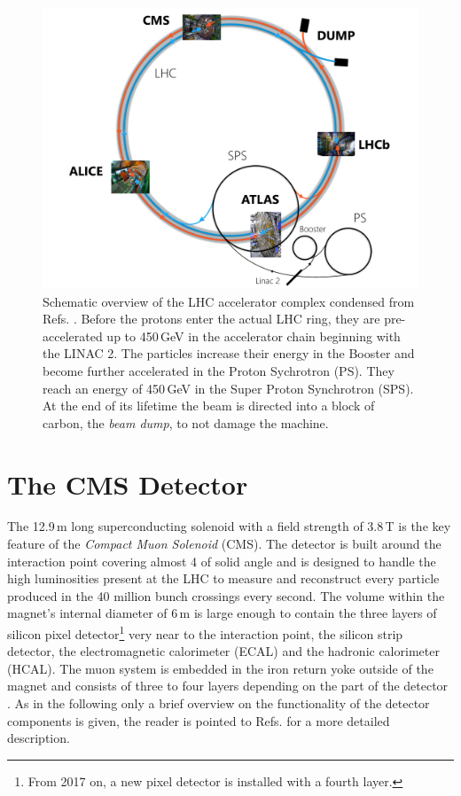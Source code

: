 \begin{figure}
    \centering
    \includegraphics[width=\textwidth]{Figures/theory/Masterthesis_diagrams_SM/Masterthesis_diagrams_LHC.pdf}
    \caption[Schematic overview of the LHC accelerator complex.]{Schematic overview of the LHC accelerator complex condensed from Refs. \cite{cds_1,cds_2,cds_3,cds_openphoto_cms,cds_openphoto_atlas,cds_openphoto_alice,cds_openphoto_lhcb}. Before the protons enter the actual LHC ring,  
    they are pre-accelerated up to 450\,{GeV} in the accelerator chain beginning with the LINAC 2. 
    The particles increase their energy in the Booster and become further accelerated in the Proton Sychrotron (PS). 
    They reach an energy of 450\,{GeV} in the Super Proton Synchrotron (SPS). At the end of its lifetime the beam 
    is directed into a block of carbon, the \textit{beam dump}, to not damage the machine.}\label{CMS:LHC_overview}
\end{figure}
\section{The CMS Detector}

The 12.9\,{m} long superconducting solenoid with a field strength of 3.8\,{T} is the key feature of the \textit{Compact Muon Solenoid} (CMS). The detector
is built around the interaction point covering almost 4\textpi{} of solid angle and is designed to handle the high luminosities present at the LHC to measure and reconstruct
every particle produced in the 40 million bunch crossings every second. The volume within the magnet's internal diameter of 6\,{m} 
is large enough to contain the three layers of silicon pixel detector\footnote{From 2017 on, a new pixel detector is installed with a fourth layer.} very near to the interaction point, the silicon strip detector, the electromagnetic calorimeter (ECAL) 
and the hadronic calorimeter (HCAL). The muon system is embedded in the iron return yoke outside of the magnet and consists of three to four layers depending on the 
part of the detector . 
 As in the following only a brief overview on the functionality of the detector components is given, the  reader is pointed to Refs.
\cite{CmsTdr1,Chatrchyan:1129810,} for a more detailed description. 

